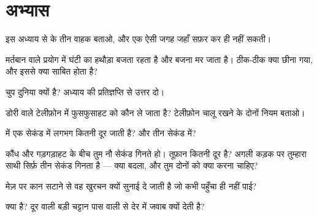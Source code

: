 \section{अभ्यास}

\begin{exercise}[$\star$]\label{exo:g4:how-sound-travels:1}
इस अध्याय से  के तीन वाहक बताओ, और एक ऐसी जगह जहाँ  सफ़र
कर ही नहीं सकती।
\end{exercise}

\begin{exercise}[$\star$]\label{exo:g4:how-sound-travels:2}
मर्तबान वाले प्रयोग में घंटी का हथौड़ा बजता रहता है और बजना मर जाता
है। ठीक-ठीक क्या छीना गया, और इससे क्या साबित होता है?
\end{exercise}

\begin{exercise}[$\star$]\label{exo:g4:how-sound-travels:3}
 चुप दुनिया क्यों है? अध्याय की प्रतिज्ञप्ति से उत्तर दो।
\end{exercise}

\begin{exercise}[$\star$]\label{exo:g4:how-sound-travels:4}
डोरी वाले टेलीफ़ोन में फुसफुसाहट को कौन ले जाता है? टेलीफ़ोन चालू
रखने के दोनों नियम बताओ।
\end{exercise}

\begin{exercise}[$\star$]\label{exo:g4:how-sound-travels:5}
 में  एक सेकंड में लगभग कितनी दूर जाती है? और तीन सेकंड में?
\end{exercise}

\begin{exercise}[$\star$]\label{exo:g4:how-sound-travels:6}
कौंध और गड़गड़ाहट के बीच तुम नौ सेकंड गिनते हो। तूफ़ान कितनी दूर है?
अगली कड़क पर तुम्हारा साथी सिर्फ़ तीन सेकंड गिनता है --- क्या बदला,
और तुम दोनों को क्या करना चाहिए?
\end{exercise}

\begin{exercise}[$\star$]\label{exo:g4:how-sound-travels:7}
मेज़ पर कान सटाने से वह खुरचन क्यों सुनाई दे जाती है जो  कभी
पहुँचा ही नहीं पाई?
\end{exercise}

\begin{exercise}[$\star$]\label{exo:g4:how-sound-travels:8}
 क्या है? दूर वाली बड़ी चट्टान पास वाली से देर में जवाब
क्यों देती है?
\end{exercise}

